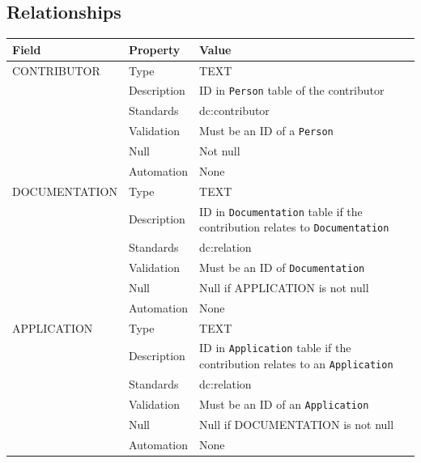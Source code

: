 \documentclass[
]{article}
\newcounter{none}
\begin{document}
\subsection{Relationships}\label{relationships-7}

{\def\LTcaptype{none} 
\begin{longtable}[]{@{}
  >{\raggedright\arraybackslash}p{}
  >{\raggedright\arraybackslash}p{}
  >{\raggedright\arraybackslash}p{}@{}}
\toprule\noalign{}
\begin{minipage}[b]{\linewidth}\raggedright
Field
\end{minipage} & \begin{minipage}[b]{\linewidth}\raggedright
Property
\end{minipage} & \begin{minipage}[b]{\linewidth}\raggedright
Value
\end{minipage} \\
\midrule\noalign{}
\endhead
\bottomrule\noalign{}
\endlastfoot
CONTRIBUTOR & Type & TEXT \\
& Description & ID in \texttt{Person} table of the contributor \\
& Standards & dc:contributor \\
& Validation & Must be an ID of a \texttt{Person} \\
& Null & Not null \\
& Automation & None \\
DOCUMENTATION & Type & TEXT \\
& Description & ID in \texttt{Documentation} table if the contribution
relates to \texttt{Documentation} \\
& Standards & dc:relation \\
& Validation & Must be an ID of \texttt{Documentation} \\
& Null & Null if APPLICATION is not null \\
& Automation & None \\
APPLICATION & Type & TEXT \\
& Description & ID in \texttt{Application} table if the contribution
relates to an \texttt{Application} \\
& Standards & dc:relation \\
& Validation & Must be an ID of an \texttt{Application} \\
& Null & Null if DOCUMENTATION is not null \\
& Automation & None \\
\end{longtable}
}
\end{document}
